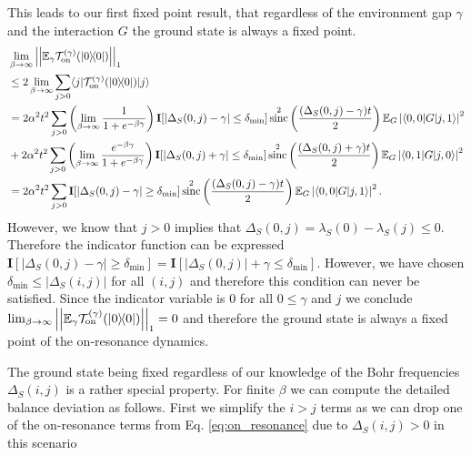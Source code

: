 \documentclass[
 amsmath,amssymb,
 aps,
onecolumn, 
nofootinbib]{revtex4-2}
\newcommand{\on}{\rm on}
\newcommand{\ket}[1]{|#1\rangle}
\newcommand{\bra}[1]{\langle #1|}
\newcommand{\ketbra}[2]{| #1\rangle\! \langle #2|}
\newcommand{\abs}[1]{\left| #1 \right|}
\newcommand{\norm}[1]{\left|\left| #1 \right|\right|}
\newcommand{\EE}{\mathbb{E}}
\DeclareMathOperator{\sinc}{sinc}
\begin{document}
This leads to our first fixed point result, that regardless of the environment gap $\gamma$ and the interaction $G$ the ground state is always a fixed point. 
\begin{align}
    &\lim_{\beta \to \infty} \norm{\EE_\gamma \mathcal{T}_{\on}^{(\gamma)} (\ketbra{0}{0})}_1 \nonumber \\
    &\le 2 \lim_{\beta \to \infty} \sum_{j > 0} \bra{j} \mathcal{T}_{\on}^{(\gamma)}(\ketbra{0}{0})\ket{j} \nonumber \\
    &= 2 \alpha^2 t^2 \sum_{j > 0} \left(\lim_{\beta \to \infty} \frac{1}{1 + e^{-\beta \gamma}} \right) \mathbf{I}[\abs{\Delta_{S}(0,j) - \gamma} \le \delta_{\min}] \sinc^2\left(\frac{(\Delta_S(0,j) - \gamma)t}{2}\right) \EE_G \abs{\bra{0,0} G \ket{j,1}}^2 \nonumber \\
    &+ 2 \alpha^2 t^2 \sum_{j > 0} \left(\lim_{\beta \to \infty} \frac{e^{-\beta \gamma}}{1 + e^{-\beta \gamma}} \right) \mathbf{I}[\abs{\Delta_{S}(0,j) + \gamma} \le \delta_{\min}] \sinc^2\left(\frac{(\Delta_S(0,j) + \gamma)t}{2}\right) \EE_G \abs{\bra{0,1} G \ket{j,0}}^2 \nonumber \\
    &= 2 \alpha^2 t^2 \sum_{j > 0} \mathbf{I}[\abs{\Delta_{S}(0,j) - \gamma} \ge \delta_{\min}] \sinc^2\left(\frac{(\Delta_S(0,j) - \gamma)t}{2}\right) \EE_G \abs{\bra{0,0} G \ket{j,1}}^2.
\end{align}
However, we know that $j > 0$ implies that $\Delta_S(0, j) = \lambda_S(0) - \lambda_S(j) \le 0$. Therefore the indicator function can be expressed $\mathbf{I}[\abs{\Delta_S(0,j) - \gamma} \ge \delta_{\min} ] = \mathbf{I}[|\Delta_S(0,j)| + \gamma \le \delta_{\min} ]$. However, we have chosen $\delta_{\min} \le |\Delta_S(i,j)|$ for all $(i, j)$ and therefore this condition can never be satisfied. Since the indicator variable is 0 for all $0 \le \gamma$ and $j$ we conclude $\lim_{\beta \to \infty} \norm{\EE_\gamma \mathcal{T}_{\on}^{(\gamma)}(\ketbra{0}{0})}_1 = 0$ and therefore the ground state is always a fixed point of the on-resonance dynamics.

The ground state being fixed regardless of our knowledge of the Bohr frequencies $\Delta_S(i,j)$ is a rather special property. For finite $\beta$ we can compute the detailed balance deviation as follows. First we simplify the $i > j$ terms as we can drop one of the on-resonance terms from Eq. \eqref{eq:on_resonance} due to $\Delta_S(i,j) > 0$ in this scenario
\end{document}
